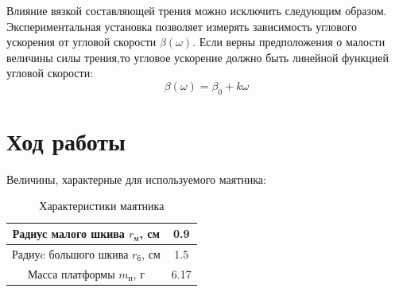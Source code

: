 \documentclass[a4paper,12pt]{article}
\begin{document}
Влияние вязкой составляющей трения можно исключить следующим образом. Экспериментальная установка позволяет измерять зависимость углового ускорения от угловой скорости $\beta (\omega)$. Если верны предположения о малости величины силы трения,то угловое ускорение должно быть линейной функцией угловой скорости:
\begin{equation}
    \beta (\omega) = \beta_0 + k\omega
\end{equation}

\section{Ход работы} 
Величины, характерные для используемого маятника:
\begin{table}[h]
    \centering
    \begin{tabular}{|c|c|}
        \hline
        Радиус малого шкива $r_{\text{м}}$, см & 0.9 \\
        \hline
        Радиуc большого шкива $r_{\text{б}}$, см & 1.5 \\
        \hline
        Масса платформы $m_{\text{п}}$, г & 6.17 \\
        \hline
    \end{tabular}
    \caption{Характеристики маятника}
\end{table}
\end{document}
